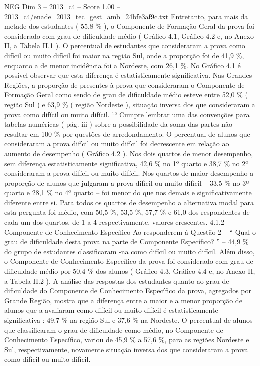 \begin{textsample}{NEG Dim 3 – 2013\_c4 – Score 1.00 – 2013\_c4/enade\_2013\_tec\_gest\_amb\_24bfe3af9c.txt}
Entretanto, para mais da metade dos estudantes ( 55,8 \% ), o Componente de Formação Geral da prova foi considerado com grau de dificuldade médio ( Gráfico 4.1, Gráfico 4.2 e, no Anexo II, a Tabela II.1 ).
O percentual de estudantes que consideraram a prova como difícil ou muito difícil foi maior na região Sul, onde a proporção foi de 41,9 \%, enquanto a de menor incidência foi a Nordeste, com 26,1 \%.
No Gráfico 4.1 é possível observar que esta diferença é estatisticamente significativa.
Nas Grandes Regiões, a proporção de presentes à prova que consideraram o Componente de Formação Geral como sendo de grau de dificuldade médio esteve entre 52,0 \% ( região Sul ) e 63,9 \% ( região Nordeste ), situação inversa dos que consideraram a prova como difícil ou muito difícil. ¹² Cumpre lembrar uma das convenções para tabelas numéricas ( pág. iii ) sobre a possibilidade da soma das partes não resultar em 100 \% por questões de arredondamento.
O percentual de alunos que consideraram a prova difícil ou muito difícil foi decrescente em relação ao aumento de desempenho ( Gráfico 4.2 ).
Nos dois quartos de menor desempenho, sem diferença estatisticamente significativa, 42,6 \% no 1º quarto e 38,7 \% no 2º consideraram a prova difícil ou muito difícil.
Nos quartos de maior desempenho a proporção de alunos que julgaram a prova difícil ou muito difícil – 33,5 \% no 3º quarto e 28,1 \% no 4º quarto – foi menor do que nos demais e significativamente diferente entre si.
Para todos os quartos de desempenho a alternativa modal para esta pergunta foi médio, com 50,5 \%, 53,5 \%, 57,7 \% e 61,0 dos respondentes de cada um dos quartos, de 1 a 4 respectivamente, valores crescentes. 4.1.2 Componente de Conhecimento Específico Ao responderem à Questão 2 – “ Qual o grau de dificuldade desta prova na parte de Componente Específico? ” – 44,9 \% do grupo de estudantes classificaram -na como difícil ou muito difícil.
Além disso, o Componente de Conhecimento Específico da prova foi considerado com grau de dificuldade médio por 50,4 \% dos alunos ( Gráfico 4.3, Gráfico 4.4 e, no Anexo II, a Tabela II.2 ).
A análise das respostas dos estudantes quanto ao grau de dificuldade do Componente de Conhecimento Específico da prova, agregados por Grande Região, mostra que a diferença entre a maior e a menor proporção de alunos que a avaliaram como difícil ou muito difícil é estatisticamente significativa : 49,7 \% na região Sul e 37,6 \% na Nordeste.
O percentual de alunos que classificaram o grau de dificuldade como médio, no Componente de Conhecimento Específico, variou de 45,9 \% a 57,6 \%, para as regiões Nordeste e Sul, respectivamente, novamente situação inversa dos que consideraram a prova como difícil ou muito difícil.

\end{textsample}
